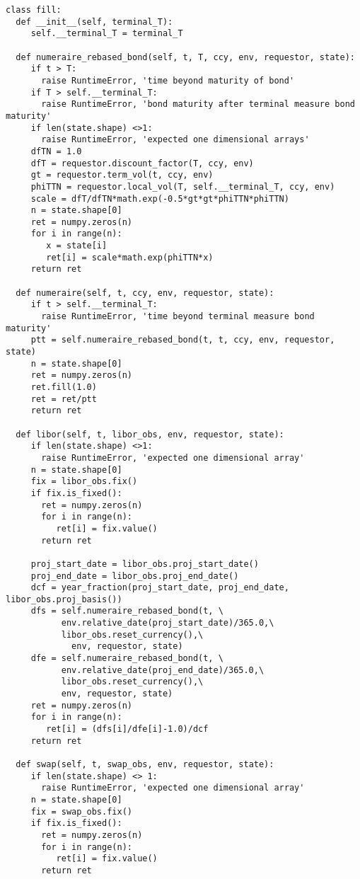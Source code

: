 \begin{verbatim}
class fill:
  def __init__(self, terminal_T):
     self.__terminal_T = terminal_T

  def numeraire_rebased_bond(self, t, T, ccy, env, requestor, state):
     if t > T:
       raise RuntimeError, 'time beyond maturity of bond'
     if T > self.__terminal_T:
       raise RuntimeError, 'bond maturity after terminal measure bond maturity'
     if len(state.shape) <>1:
       raise RuntimeError, 'expected one dimensional arrays'
     dfTN = 1.0
     dfT = requestor.discount_factor(T, ccy, env)
     gt = requestor.term_vol(t, ccy, env)
     phiTTN = requestor.local_vol(T, self.__terminal_T, ccy, env)
     scale = dfT/dfTN*math.exp(-0.5*gt*gt*phiTTN*phiTTN) 
     n = state.shape[0]
     ret = numpy.zeros(n)
     for i in range(n):
        x = state[i]
        ret[i] = scale*math.exp(phiTTN*x)
     return ret

  def numeraire(self, t, ccy, env, requestor, state):
     if t > self.__terminal_T:
       raise RuntimeError, 'time beyond terminal measure bond maturity'
     ptt = self.numeraire_rebased_bond(t, t, ccy, env, requestor, state)
     n = state.shape[0]
     ret = numpy.zeros(n)
     ret.fill(1.0)
     ret = ret/ptt
     return ret

  def libor(self, t, libor_obs, env, requestor, state):
     if len(state.shape) <>1:
       raise RuntimeError, 'expected one dimensional array'
     n = state.shape[0]
     fix = libor_obs.fix()
     if fix.is_fixed():
       ret = numpy.zeros(n)
       for i in range(n):
          ret[i] = fix.value()
       return ret

     proj_start_date = libor_obs.proj_start_date()
     proj_end_date = libor_obs.proj_end_date()
     dcf = year_fraction(proj_start_date, proj_end_date, libor_obs.proj_basis())
     dfs = self.numeraire_rebased_bond(t, \
           env.relative_date(proj_start_date)/365.0,\
           libor_obs.reset_currency(),\
             env, requestor, state)
     dfe = self.numeraire_rebased_bond(t, \
           env.relative_date(proj_end_date)/365.0,\
           libor_obs.reset_currency(),\
           env, requestor, state)
     ret = numpy.zeros(n)
     for i in range(n):
        ret[i] = (dfs[i]/dfe[i]-1.0)/dcf
     return ret

  def swap(self, t, swap_obs, env, requestor, state):
     if len(state.shape) <> 1:
       raise RuntimeError, 'expected one dimensional array'
     n = state.shape[0]
     fix = swap_obs.fix()
     if fix.is_fixed():
       ret = numpy.zeros(n)
       for i in range(n):
          ret[i] = fix.value()
       return ret


\end{verbatim}
